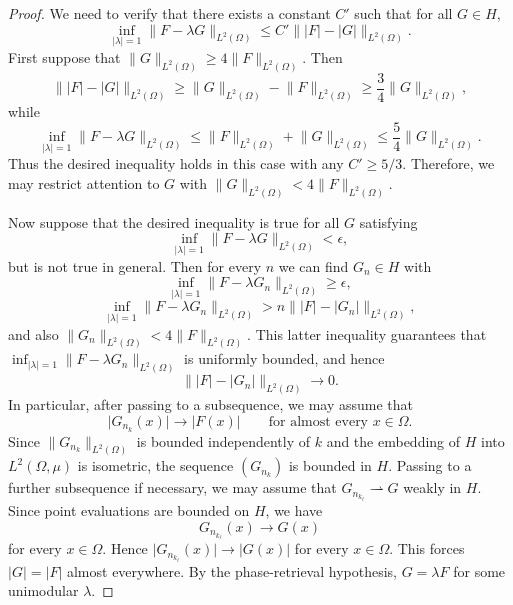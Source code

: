 \documentclass[11pt]{amsart}
\theoremstyle{remark}
\begin{document}
\begin{proof}
We need to verify that there exists a constant \(C'\) such that for all
\(G\in H\),
\[
\inf_{\lvert \lambda \rvert=1}\lVert F-\lambda G \rVert_{L^2(\Omega)}
\le
C'\lVert \lvert F \rvert-\lvert G \rvert \rVert_{L^2(\Omega)}.
\]
First suppose that \(\lVert G \rVert_{L^2(\Omega)}\ge4\lVert F \rVert_{L^2(\Omega)}\).
Then
\[
\lVert \lvert F \rvert-\lvert G \rvert \rVert_{L^2(\Omega)}
\ge
\lVert G \rVert_{L^2(\Omega)}-\lVert F \rVert_{L^2(\Omega)}
\ge
\frac34\lVert G \rVert_{L^2(\Omega)},
\]
while
\[
\inf_{\lvert \lambda \rvert=1}\lVert F-\lambda G \rVert_{L^2(\Omega)}
\le
\lVert F \rVert_{L^2(\Omega)}+\lVert G \rVert_{L^2(\Omega)}
\le
\frac54\lVert G \rVert_{L^2(\Omega)}.
\]
Thus the desired inequality holds in this case with any \(C'\ge5/3\).
Therefore, we may restrict attention to \(G\) with
\(\lVert G \rVert_{L^2(\Omega)}<4\lVert F \rVert_{L^2(\Omega)}\).
\medskip


Now suppose that the desired inequality is true for all \(G\) satisfying
\[
\inf_{\lvert \lambda \rvert=1}\lVert F-\lambda G \rVert_{L^2(\Omega)}<\epsilon,
\]
but is not true in general. Then for every \(n\) we can find \(G_n\in H\)
with
\[
\inf_{\lvert \lambda \rvert=1}\lVert F-\lambda G_n \rVert_{L^2(\Omega)}\ge\epsilon,
\]
\[
\inf_{\lvert \lambda \rvert=1}\lVert F-\lambda G_n \rVert_{L^2(\Omega)}
>
n\lVert \lvert F \rvert-\lvert G_n \rvert \rVert_{L^2(\Omega)},
\]
and also \(\lVert G_n \rVert_{L^2(\Omega)}<4\lVert F \rVert_{L^2(\Omega)}\). This latter
inequality guarantees that
\(\inf_{\lvert \lambda \rvert=1}\lVert F-\lambda G_n \rVert_{L^2(\Omega)}\) is uniformly
bounded, and hence
\[
\lVert \lvert F \rvert-\lvert G_n \rvert \rVert_{L^2(\Omega)}\to0.
\]
In particular, after passing to a subsequence, we may assume that
\[
\lvert G_{n_k}(x) \rvert\to\lvert F(x) \rvert
\qquad\text{for almost every }x\in\Omega.
\]
Since \(\lVert G_{n_k} \rVert_{L^2(\Omega)}\) is bounded independently of \(k\) and
the embedding of \(H\) into \(L^2(\Omega,\mu)\) is isometric, the sequence
\((G_{n_k})\) is bounded in \(H\). Passing to a further subsequence if
necessary, we may assume that \(G_{n_{k_\ell}}\rightharpoonup G\) weakly in
\(H\). Since point evaluations are bounded on \(H\), we have
\[
G_{n_{k_\ell}}(x)\to G(x)
\]
for every \(x\in\Omega\). Hence \(\lvert G_{n_{k_\ell}}(x) \rvert\to\lvert G(x) \rvert\) for
every \(x\in\Omega\). This forces \(\lvert G \rvert=\lvert F \rvert\) almost everywhere. By the
phase-retrieval hypothesis, \(G=\lambda F\) for some unimodular \(\lambda\).
\medskip


\end{proof}
\end{document}
